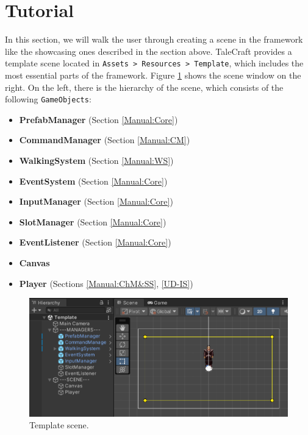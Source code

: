 \section{Tutorial}
In this section, we will walk the user through creating a scene in the framework like the showcasing ones described in the section above. TaleCraft provides a template scene located in \verb|Assets > Resources > Template|, which includes the most essential parts of the framework. Figure \ref{fig:Tutorial-template} shows the scene window on the right. On the left, there is the hierarchy of the scene, which consists of the following \verb|GameObjects|:
\begin{itemize}
    \item \textbf{PrefabManager} (Section \ref{Manual:Core})
    \item \textbf{CommandManager} (Section \ref{Manual:CM})
    \item \textbf{WalkingSystem} (Section \ref{Manual:WS})
    \item \textbf{EventSystem} (Section \ref{Manual:Core})
    \item \textbf{InputManager} (Section \ref{Manual:Core})
    \item \textbf{SlotManager} (Section \ref{Manual:Core})
    \item \textbf{EventListener} (Section \ref{Manual:Core}) 
    \item \textbf{Canvas}
    \item \textbf{Player} (Sections \ref{Manual:ChM&SS}, \ref{UD-IS})
\end{itemize}

\begin{figure}[H]
\centering
\includegraphics[width=.9\linewidth]{img/User doc/image_2025-07-08_100816915.png}
\caption{Template scene.}
\label{fig:Tutorial-template}
\end{figure}

